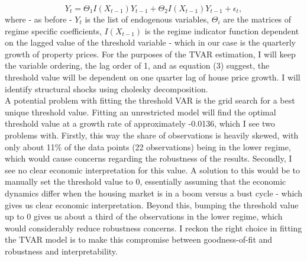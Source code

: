\documentclass[12pt,a4paper]{article}
\begin{document}
 \begin{equation}
 	Y_{t} = \Theta_{1}I(X_{t-1})Y_{t-1}+\Theta_{2}I(X_{t-1})Y_{t-1} + \epsilon_{t},
 \end{equation}
where - as before - $Y_{t}$ is the list of endogenous variables, $\Theta_{i}$ are the matrices of regime specific coefficients, $I(X_{t-1})$ is the regime indicator function dependent on the lagged value of the threshold variable - which in our case is the quarterly growth of property prices. For the purposes of the TVAR estimation, I will keep the variable ordering, the lag order of 1, and as equation (3) suggest, the threshold value will be dependent on one quarter lag of house price growth. I will identify structural shocks using cholesky decomposition. \\ 

A potential problem with fitting the threshold VAR is the grid search for a best unique threshold value. Fitting an unrestricted model will find the optimal threshold value at a growth rate of approximately -0.0136, which I see two problems with. Firstly, this way the share of observations is heavily skewed, with only about 11\% of the data points (22 observations) being in the lower regime, which would cause concerns regarding the robustness of the results. Secondly, I see no clear economic interpretation for this value. A solution to this would be to manually set the threshold value to 0, essentially assuming that the economic dynamics differ when the housing market is in a boom versus a bust cycle - which gives us clear economic interpretation. Beyond this, bumping the threshold value up to 0 gives us about a third of the observations in the lower regime, which would considerably reduce robustness concerns. I reckon the right choice in fitting the TVAR model is to make this compromise between goodness-of-fit and robustness and interpretability.
\end{document}
